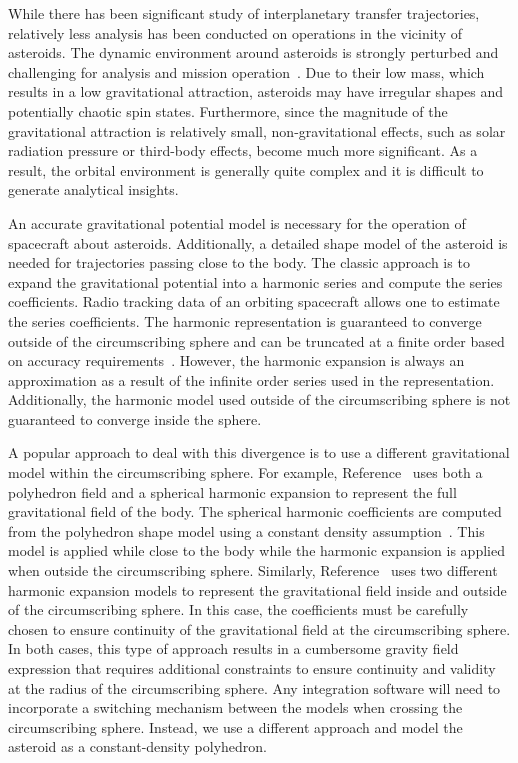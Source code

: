 \documentclass[]{aiaa-tc}%
\begin{document}
While there has been significant study of interplanetary transfer trajectories, relatively less analysis has been conducted on operations in the vicinity of asteroids.
The dynamic environment around asteroids is strongly perturbed and challenging for analysis and mission operation~\cite{scheeres1994,scheeres2000}.
Due to their low mass, which results in a low gravitational attraction, asteroids may have irregular shapes and potentially chaotic spin states.
Furthermore, since the magnitude of the gravitational attraction is relatively small, non-gravitational effects, such as solar radiation pressure or third-body effects, become much more significant.
As a result, the orbital environment is generally quite complex and it is difficult to generate analytical insights.

An accurate gravitational potential model is necessary for the operation of spacecraft about asteroids.
Additionally, a detailed shape model of the asteroid is needed for trajectories passing close to the body.
The classic approach is to expand the gravitational potential into a harmonic series and compute the series coefficients.
Radio tracking data of an orbiting spacecraft allows one to estimate the series coefficients.
The harmonic representation is guaranteed to converge outside of the circumscribing sphere and can be truncated at a finite order based on accuracy requirements~\cite{scheeres2012a}.
However, the harmonic expansion is always an approximation as a result of the infinite order series used in the representation.
Additionally, the harmonic model used outside of the circumscribing sphere is not guaranteed to converge inside the sphere.

A popular approach to deal with this divergence is to use a different gravitational model within the circumscribing sphere.
For example, Reference~ uses both a polyhedron field and a spherical harmonic expansion to represent the full gravitational field of the body.
The spherical harmonic coefficients are computed from the polyhedron shape model using a constant density assumption~\cite{werner1997}.
This model is applied while close to the body while the harmonic expansion is applied when outside the circumscribing sphere.
Similarly, Reference~ uses two different harmonic expansion models to represent the gravitational field inside and outside of the circumscribing sphere.
In this case, the coefficients must be carefully chosen to ensure continuity of the gravitational field at the circumscribing sphere.
In both cases, this type of approach results in a cumbersome gravity field expression that requires additional constraints to ensure continuity and validity at the radius of the circumscribing sphere.
Any integration software will need to incorporate a switching mechanism between the models when crossing the circumscribing sphere.
Instead, we use a different approach and model the asteroid as a constant-density polyhedron.
\end{document}
